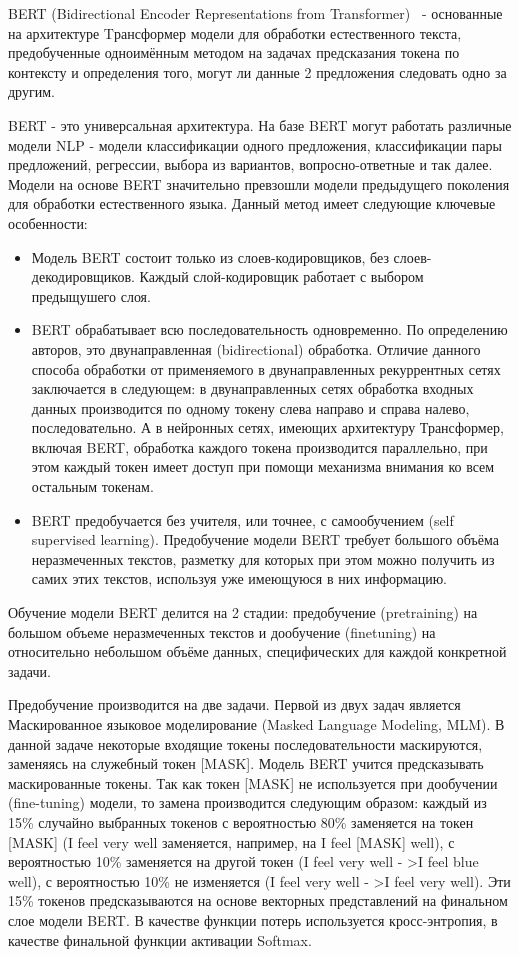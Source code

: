 BERT (Bidirectional Encoder Representations from Transformer)~\cite{devlin_2018} - основанные на архитектуре Tрансформер модели для обработки естественного текста, предобученные одноимённым методом на задачах предсказания токена по контексту и определения того, могут ли данные 2 предложения следовать одно за другим. 

BERT - это универсальная архитектура. На базе BERT могут работать различные модели NLP - модели классификации одного предложения, классификации пары предложений, регрессии, выбора из вариантов, вопросно-ответные и так далее. Модели на основе BERT значительно превзошли модели предыдущего поколения для обработки естественного языка. 
Данный метод имеет следующие ключевые особенности:
\begin{itemize}
\item Модель BERT состоит только из слоев-кодировщиков, без слоев-декодировщиков. Каждый слой-кодировщик работает с выбором предыщушего слоя.
\item BERT обрабатывает всю последовательность одновременно. По определению авторов, это двунаправленная (bidirectional) обработка. Отличие данного способа обработки от применяемого в двунаправленных рекуррентных сетях заключается в следующем: в двунаправленных сетях обработка входных данных производится по одному токену слева направо и справа налево, последовательно. А в нейронных сетях, имеющих архитектуру Трансформер, включая BERT, обработка каждого токена производится параллельно, при этом каждый токен имеет доступ при помощи механизма внимания ко всем остальным токенам. 
\item BERT предобучается без учителя, или точнее, с самообучением (self supervised learning). Предобучение модели BERT требует большого объёма неразмеченных текстов, разметку для которых при этом можно получить из самих этих текстов, используя уже имеющуюся в них информацию.
\end{itemize}
Обучение модели BERT делится на 2 стадии: предобучение (pretraining) на большом объеме неразмеченных текстов и дообучение (finetuning) на относительно небольшом объёме данных, специфических для каждой конкретной задачи.

Предобучение производится на две задачи. Первой из двух задач является Маскированное языковое моделирование (Masked Language Modeling, MLM). В данной задаче некоторые входящие токены последовательности маскируются, заменяясь на служебный токен [MASK]. Модель BERT учится предсказывать маскированные токены. Так как токен [MASK] не используется при дообучении (fine-tuning) модели, то замена производится следующим образом: каждый из 15\% случайно выбранных токенов с вероятностью 80\% заменяется на токен [MASK] (I feel very well заменяется, например, на I feel [MASK] well), с вероятностью 10\% заменяется на другой токен (I feel very well - >I feel blue well), с вероятностью 10\% не изменяется (I feel very well - >I feel very well). Эти 15\% токенов предсказываются на основе векторных представлений на финальном слое модели BERT. В качестве функции потерь используется кросс-энтропия, в качестве финальной функции активации Softmax. 

